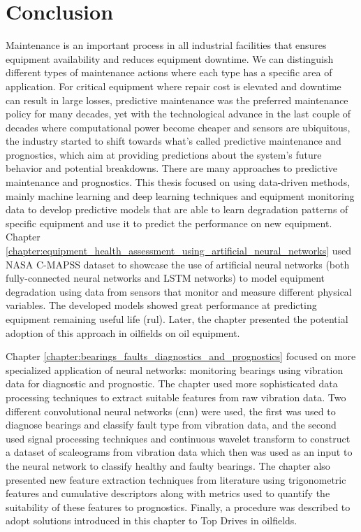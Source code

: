 \chapter*{Conclusion}
Maintenance is an important process in all industrial facilities that ensures equipment availability and reduces equipment downtime. We can distinguish different types of maintenance actions where each type has a specific area of application. For critical equipment where repair cost is elevated and downtime can result in large losses, predictive maintenance was the preferred maintenance policy for many decades, yet with the technological advance in the last couple of decades where computational power become cheaper and sensors are ubiquitous, the industry started to shift towards what's called predictive maintenance and prognostics, which aim at providing predictions about the system's future behavior and potential breakdowns. There are many approaches to predictive maintenance and prognostics. This thesis focused on using data-driven methods, mainly machine learning and deep learning techniques and equipment monitoring data to develop predictive models that are able to learn degradation patterns of specific equipment and use it to predict the performance on new equipment. Chapter \ref{chapter:equipment_health_assessment_using_artificial_neural_networks} used NASA C-MAPSS dataset to showcase the use of artificial neural networks (both fully-connected neural networks and LSTM networks) to model equipment degradation using data from sensors that monitor and measure different physical variables. The developed models showed great performance at predicting equipment remaining useful life (\acrshort{rul}). Later, the chapter presented the potential adoption of this approach in oilfields on oil equipment.

Chapter \ref{chapter:bearings_faults_diagnostics_and_prognostics} focused on more specialized application of neural networks: monitoring bearings using vibration data for diagnostic and prognostic. The chapter used more sophisticated data processing techniques to extract suitable features from raw vibration data. Two different convolutional neural networks (\acrshort{cnn}) were  used, the first was used to diagnose bearings and classify fault type from vibration data, and the second used signal processing techniques and continuous wavelet transform to construct a dataset of scaleograms from vibration data which then was used as an input to the neural network to classify healthy and faulty bearings. The chapter also presented new feature extraction techniques from literature using trigonometric features and cumulative descriptors along with metrics used to quantify the suitability of these features to prognostics. Finally, a procedure was described to adopt solutions introduced in this chapter to Top Drives in oilfields.
